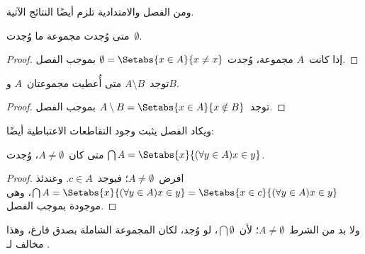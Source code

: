 \documentclass[../../../include/open-logic-section]{subfiles}
\begin{document}
ومن الفصل والامتدادية تلزم أيضًا النتائج الآتية.

\begin{prop}
متى وُجدت مجموعة ما وُجدت~$\emptyset$.
\end{prop}

\begin{proof}
  إذا كانت~$A$ مجموعة، وُجدت
  $\emptyset = \Setabs{x \in A}{x \neq x}$ بموجب الفصل.
\end{proof}

\begin{prop}
توجد~$A \setminus B$ متى أُعطيت مجموعتان~$A$ و$B$.
\end{prop}

\begin{proof}
توجد~$A \setminus B = \Setabs{x \in A}{x \notin B}$ بموجب الفصل.
\end{proof}

ويكاد الفصل يثبت وجود التقاطعات الاعتباطية أيضًا:

\begin{prop}
  متى كان~$A \neq \emptyset$، وُجدت
  $\bigcap A = \Setabs{x}{(\forall y \in A)x \in y}$.
\end{prop}

\begin{proof}
افرض~$A \neq \emptyset$؛ فيوجد~$c \in A$. وعندئذ
$\bigcap A = \Setabs{x}{(\forall y \in A)x \in y} =
\Setabs{x \in c}{(\forall y \in A)x \in y}$، وهي موجودة بموجب الفصل.
\end{proof}

ولا بد من الشرط~$A \neq \emptyset$؛ لأن~$\bigcap \emptyset$، لو وُجد،
لكان المجموعة الشاملة بصدق فارغ، وهذا مخالف لـ
.
\end{document}
